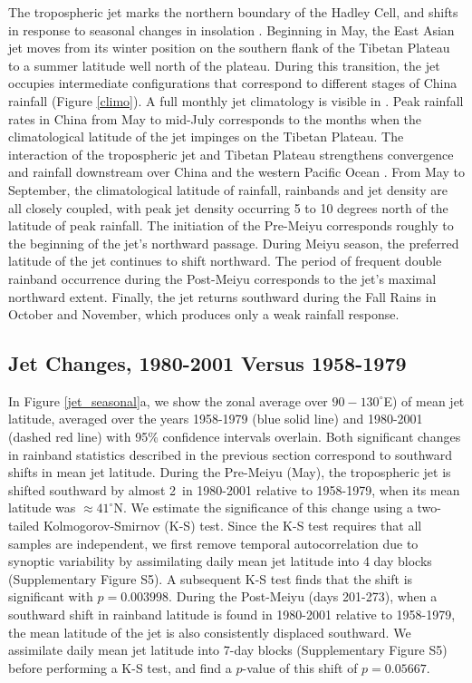 	The tropospheric jet marks the northern boundary of the Hadley Cell, and shifts in response to seasonal changes in insolation \citep{Bordoni2008}. Beginning in May, the East Asian jet moves from its winter position on the southern flank of the Tibetan Plateau to a summer latitude well north of the plateau. During this transition, the jet occupies intermediate configurations that correspond to different stages of China rainfall (Figure \ref{climo}). A full monthly jet climatology is visible in \citet{Schiemann2009}. Peak rainfall rates in China from May to mid-July corresponds to the months when the climatological latitude of the jet impinges on the Tibetan Plateau. The interaction of the tropospheric jet and Tibetan Plateau strengthens convergence and rainfall downstream over China and the western Pacific Ocean \citep{Molnar2010,Sampe2010,Chen2014}. From May to September,  the climatological latitude of rainfall, rainbands and jet density are all closely coupled, with peak jet density occurring 5 to 10 degrees north of the latitude of peak rainfall. The initiation of the Pre-Meiyu corresponds roughly to the beginning of the jet's northward passage. During Meiyu season, the preferred latitude of the jet continues to shift northward. The period of frequent double rainband occurrence during the Post-Meiyu corresponds to the jet's maximal northward extent. Finally, the jet returns southward during the Fall Rains in October and November, which produces only a weak rainfall response.
	
\subsection{Jet Changes, 1980-2001 Versus 1958-1979}

	In Figure \ref{jet_seasonal}a, we show the zonal average over $90-130^\circ$E) of mean jet latitude, averaged over the years 1958-1979 (blue solid line) and 1980-2001 (dashed red line) with 95\% confidence intervals overlain. Both significant changes in rainband statistics described in the previous section correspond to southward shifts in mean jet latitude. During the Pre-Meiyu (May), the tropospheric jet is shifted southward by almost 2\textdegree\ in 1980-2001 relative to 1958-1979, when its mean latitude was $\approx 41^\circ$N. We estimate the significance of this change using a two-tailed Kolmogorov-Smirnov (K-S) test. Since the K-S test requires that all samples are independent, we first remove temporal autocorrelation due to synoptic variability by assimilating daily mean jet latitude into 4 day blocks (Supplementary Figure S5). A subsequent K-S test finds that the shift is significant with $p=0.003998$. During the Post-Meiyu (days 201-273), when a southward shift in rainband latitude is found in 1980-2001 relative to 1958-1979, the mean latitude of the jet is also consistently displaced southward. We assimilate daily mean jet latitude into 7-day blocks (Supplementary Figure S5) before performing a K-S test, and find a $p$-value of this shift of $p=0.05667$.

